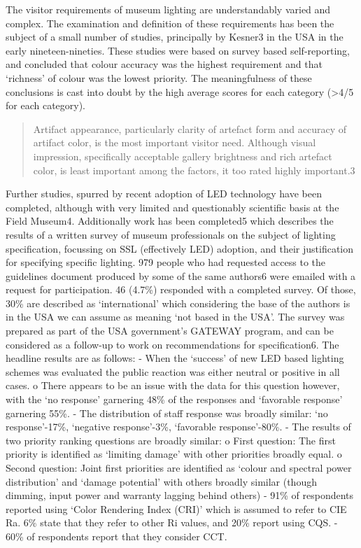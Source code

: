 The visitor requirements of museum lighting are understandably varied and complex. The examination and definition of these requirements has been the subject of a small number of studies, principally by Kesner3 in the USA in the early nineteen-nineties. These studies were based on survey based self-reporting, and concluded that colour accuracy was the highest requirement and that `richness' of colour was the lowest priority. The meaningfulness of these conclusions is cast into doubt by the high average scores for each category (>4/5 for each category).
\begin{quote}
Artifact appearance, particularly clarity of artefact form and accuracy of artifact color, is the most important visitor need. Although visual impression, specifically acceptable gallery brightness and rich artefact color, is least important among the factors, it too rated highly important.3
\end{quote}
Further studies, spurred by recent adoption of LED technology have been completed, although with very limited and questionably scientific basis at the Field Museum4.
Additionally work has been completed5 which describes the results of a written survey of museum professionals on the subject of lighting specification, focussing on SSL (effectively LED) adoption, and their justification for specifying specific lighting. 
979 people who had requested access to the guidelines document produced by some of the same authors6 were emailed with a request for participation. 46 (4.7\%) responded with a completed survey. Of those, 30\% are described as `international' which considering the base of the authors is in the USA we can assume as meaning `not based in the USA'. The survey was prepared as part of the USA government's GATEWAY program, and can be considered as a follow-up to work on recommendations for specification6. 
The headline results are as follows:
-	When the `success' of new LED based lighting schemes was evaluated the public reaction was either neutral or positive in all cases. 
o	There appears to be an issue with the data for this question however, with the `no response' garnering 48\% of the responses and `favorable response' garnering 55\%.
-	The distribution of staff response was broadly similar: `no response'-17\%, `negative response'-3\%, `favorable response'-80\%.
-	The results of two priority ranking questions  are broadly similar:
o	First question: The first priority is identified as `limiting damage' with other priorities broadly equal.
o	Second question: Joint first priorities are identified as `colour and spectral power distribution' and `damage potential' with others broadly similar (though dimming, input power and warranty lagging behind others)
-	91\% of respondents reported using `Color Rendering Index (CRI)' which is assumed to refer to CIE Ra. 6\% state that they refer to other Ri values, and 20\% report using CQS.
-	60\% of respondents report that they consider \gls{CCT}.



